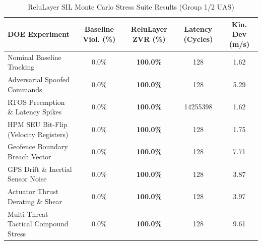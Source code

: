 \begin{table}[htbp]
\centering
\caption{ReluLayer SIL Monte Carlo Stress Suite Results (Group 1/2 UAS)}
\label{tab:relulayer_doe_results}
\begin{tabular}{lcccc}
\hline
\textbf{DOE Experiment} & \textbf{Baseline Viol. (\%)} & \textbf{ReluLayer ZVR (\%)} & \textbf{Latency (Cycles)} & \textbf{Kin. Dev (m/s)} \\
\hline
Nominal Baseline Tracking & 0.0\% & \textbf{100.0\%} & 128 & 1.62 \\
Adversarial Spoofed Commands & 0.0\% & \textbf{100.0\%} & 128 & 5.29 \\
RTOS Preemption \& Latency Spikes & 0.0\% & \textbf{100.0\%} & 14255398 & 1.62 \\
HPM SEU Bit-Flip (Velocity Registers) & 0.0\% & \textbf{100.0\%} & 128 & 1.75 \\
Geofence Boundary Breach Vector & 0.0\% & \textbf{100.0\%} & 128 & 7.71 \\
GPS Drift \& Inertial Sensor Noise & 0.0\% & \textbf{100.0\%} & 128 & 3.87 \\
Actuator Thrust Derating \& Shear & 0.0\% & \textbf{100.0\%} & 128 & 3.97 \\
Multi-Threat Tactical Compound Stress & 0.0\% & \textbf{100.0\%} & 128 & 9.61 \\
\hline
\end{tabular}
\end{table}